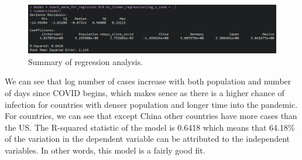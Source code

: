 \documentclass[
]{article}
\newenvironment{Shaded}{\begin{snugshade}}{\end{snugshade}}
\newcommand{\AttributeTok}[1]{\textcolor[rgb]{0.13,0.29,0.53}{#1}}
\newcommand{\ConstantTok}[1]{\textcolor[rgb]{0.56,0.35,0.01}{#1}}
\newcommand{\FunctionTok}[1]{\textcolor[rgb]{0.13,0.29,0.53}{\textbf{#1}}}
\newcommand{\NormalTok}[1]{#1}
\newcommand{\OtherTok}[1]{\textcolor[rgb]{0.56,0.35,0.01}{#1}}
\newcommand{\SpecialCharTok}[1]{\textcolor[rgb]{0.81,0.36,0.00}{\textbf{#1}}}
\newcommand{\StringTok}[1]{\textcolor[rgb]{0.31,0.60,0.02}{#1}}
\begin{document}
\begin{Shaded}
\end{Shaded}

\begin{figure}
\centering
\includegraphics{../figures/ml_regression_summary.JPG}
\caption{Summary of regression analysis.}
\end{figure}

We can see that log number of cases increase with both population and
number of days since COVID begins, which makes sence as there is a
higher chance of infection for countries with denser population and
longer time into the pandemic. For countries, we can see that except
China other countries have more cases than the US. The R-squared
statistic of the model is 0.6418 which means that 64.18\% of the
variation in the dependent variable can be attributed to the independent
variables. In other words, this model is a fairly good fit.
\end{document}
